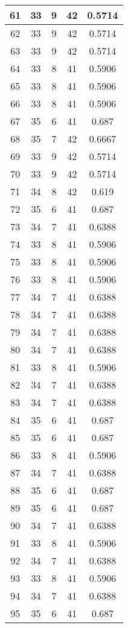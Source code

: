\documentclass[letterpaper, 12pt]{article}
\begin{document}
\begin{longtable}{|c|c|c|c|c|}
61 & 33 & 9 & 42 & 0.5714 \\
\hline
62 & 33 & 9 & 42 & 0.5714 \\
\hline
63 & 33 & 9 & 42 & 0.5714 \\
\hline
64 & 33 & 8 & 41 & 0.5906 \\
\hline
65 & 33 & 8 & 41 & 0.5906 \\
\hline
66 & 33 & 8 & 41 & 0.5906 \\
\hline
67 & 35 & 6 & 41 & 0.687 \\
\hline
68 & 35 & 7 & 42 & 0.6667 \\
\hline
69 & 33 & 9 & 42 & 0.5714 \\
\hline
70 & 33 & 9 & 42 & 0.5714 \\
\hline
71 & 34 & 8 & 42 & 0.619 \\
\hline
72 & 35 & 6 & 41 & 0.687 \\
\hline
73 & 34 & 7 & 41 & 0.6388 \\
\hline
74 & 33 & 8 & 41 & 0.5906 \\
\hline
75 & 33 & 8 & 41 & 0.5906 \\
\hline
76 & 33 & 8 & 41 & 0.5906 \\
\hline
77 & 34 & 7 & 41 & 0.6388 \\
\hline
78 & 34 & 7 & 41 & 0.6388 \\
\hline
79 & 34 & 7 & 41 & 0.6388 \\
\hline
80 & 34 & 7 & 41 & 0.6388 \\
\hline
81 & 33 & 8 & 41 & 0.5906 \\
\hline
82 & 34 & 7 & 41 & 0.6388 \\
\hline
83 & 34 & 7 & 41 & 0.6388 \\
\hline
84 & 35 & 6 & 41 & 0.687 \\
\hline
85 & 35 & 6 & 41 & 0.687 \\
\hline
86 & 33 & 8 & 41 & 0.5906 \\
\hline
87 & 34 & 7 & 41 & 0.6388 \\
\hline
88 & 35 & 6 & 41 & 0.687 \\
\hline
89 & 35 & 6 & 41 & 0.687 \\
\hline
90 & 34 & 7 & 41 & 0.6388 \\
\hline
91 & 33 & 8 & 41 & 0.5906 \\
\hline
92 & 34 & 7 & 41 & 0.6388 \\
\hline
93 & 33 & 8 & 41 & 0.5906 \\
\hline
94 & 34 & 7 & 41 & 0.6388 \\
\hline
95 & 35 & 6 & 41 & 0.687 \\

\end{longtable}
\end{document}
